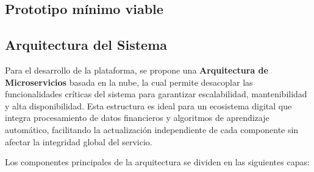 \subsection*{Prototipo mínimo viable}








\subsection*{Arquitectura del Sistema}

Para el desarrollo de la plataforma, se propone una \textbf{Arquitectura de Microservicios} basada en la nube, la cual permite desacoplar las funcionalidades críticas del sistema para garantizar escalabilidad, mantenibilidad y alta disponibilidad. Esta estructura es ideal para un ecosistema digital que integra procesamiento de datos financieros y algoritmos de aprendizaje automático, facilitando la actualización independiente de cada componente sin afectar la integridad global del servicio.

Los componentes principales de la arquitectura se dividen en las siguientes capas:

